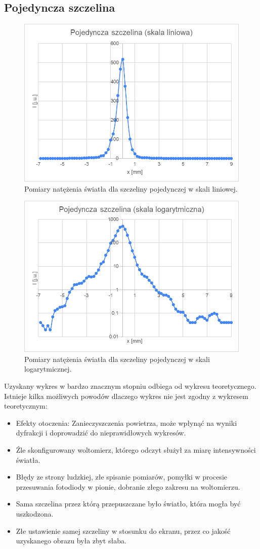 \documentclass{fizykalab}
\begin{document}
\subsection{Pojedyncza szczelina}

\begin{figure}[H]
    \centering
    \includegraphics[width=0.65\linewidth]{wykres_poj_lin.png}
    \caption{Pomiary natężenia światła dla szczeliny pojedynczej w skali liniowej.}
\end{figure}

\begin{figure}[H]
    \centering
    \includegraphics[width=0.65\linewidth]{wykres-poj-log.png}
    \caption{Pomiary natężenia światła dla szczeliny pojedynczej w skali logarytmicznej.
    }
\end{figure}

Uzyskany wykres w bardzo znacznym stopniu odbiega od wykresu teoretycznego.
Istnieje kilka możliwych powodów 
dlaczego wykres nie jest zgodny z wykresem teoretycznym:
\begin{itemize}
    \item Efekty otoczenia: Zanieczyszczenia powietrza, 
    może wpłynąć na wyniki dyfrakcji i doprowadzić do nieprawidłowych wykresów.
    \item Źle skonfigurowany woltomierz, którego odczyt służył za miarę
          intensywności światła.
    \item Błędy ze strony ludzkiej, złe spisanie pomiarów, pomyłki 
          w procesie przesuwania fotodiody w pionie, 
          dobranie złego zakresu na woltomierzu.
    \item Sama szczelina przez którą przepuszczane było światło,
          która mogła być uszkodzona.
    \item Złe ustawienie samej szczeliny w stosunku do ekranu,
          przez co jakość uzyskanego obrazu była zbyt słaba.
\end{itemize}
\end{document}
